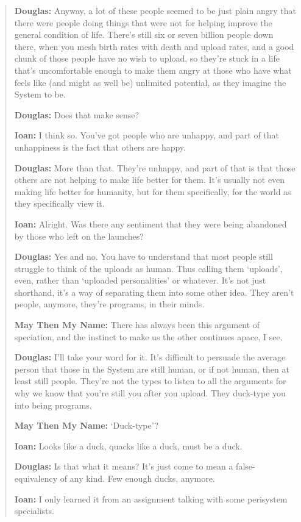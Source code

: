\begin{quote}
\textbf{Douglas:} Anyway, a lot of these people seemed to be just plain angry that there were people doing things that were not for helping improve the general condition of life. There's still six or seven billion people down there, when you mesh birth rates with death and upload rates, and a good chunk of those people have no wish to upload, so they're stuck in a life that's uncomfortable enough to make them angry at those who have what feels like (and might as well be) unlimited potential, as they imagine the System to be.

\textbf{Douglas:} Does that make sense?

\textbf{Ioan:} I think so. You've got people who are unhappy, and part of that unhappiness is the fact that others are happy.

\textbf{Douglas:} More than that. They're unhappy, and part of that is that those others are not helping to make life better for them. It's usually not even making life better for humanity, but for them specifically, for the world as they specifically view it.

\textbf{Ioan:} Alright. Was there any sentiment that they were being abandoned by those who left on the launches?

\textbf{Douglas:} Yes and no. You have to understand that most people still struggle to think of the uploads as human. Thus calling them `uploads', even, rather than `uploaded personalities' or whatever. It's not just shorthand, it's a way of separating them into some other idea. They aren't people, anymore, they're programs, in their minds.

\textbf{May Then My Name:} There has always been this argument of speciation, and the instinct to make us the other continues apace, I see.

\textbf{Douglas:} I'll take your word for it. It's difficult to persuade the average person that those in the System are still human, or if not human, then at least still people. They're not the types to listen to all the arguments for why we know that you're still you after you upload. They duck-type you into being programs.

\textbf{May Then My Name:} `Duck-type'?

\textbf{Ioan:} Looks like a duck, quacks like a duck, must be a duck.

\textbf{Douglas:} Is that what it means? It's just come to mean a false-equivalency of any kind. Few enough ducks, anymore.

\textbf{Ioan:} I only learned it from an assignment talking with some perisystem specialists.


\end{quote}
